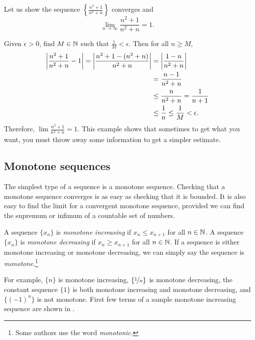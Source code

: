 \begin{example}
Let us show the sequence $\left\{ \frac{n^2+1}{n^2+n} \right\}$ converges and
\begin{equation*}
\lim_{n\to\infty} \frac{n^2+1}{n^2+n} = 1 .
\end{equation*}

Given $\epsilon > 0$,
find $M \in {\mathbb{N}}$ such that $\frac{1}{M} < \epsilon$.  Then for all $n \geq
M$,
\begin{equation*}
\begin{split}
\left\lvert {\frac{n^2+1}{n^2+n} - 1} \right\rvert  =
\left\lvert {\frac{n^2+1 - (n^2+n)}{n^2+n}} \right\rvert
& =
\left\lvert {\frac{1 - n}{n^2+n}} \right\rvert \\
& =
\frac{n-1}{n^2+n} \\
& \leq 
\frac{n}{n^2+n} 
 =
\frac{1}{n+1}  \\
& \leq \frac{1}{n}
\leq \frac{1}{M} < \epsilon .
\end{split}
\end{equation*}
Therefore,
$\lim \frac{n^2+1}{n^2+n} = 1$.
This example shows that sometimes to get what you want, you must throw away
some information to get a simpler estimate.
\end{example}

\subsection{Monotone sequences}

The simplest type of a sequence is a monotone sequence.  Checking that
a monotone sequence converges is as easy as checking that it is bounded.
It is also easy to find
the limit for a convergent
monotone sequence, provided we can find the supremum or infimum
of a countable set of numbers.

\begin{defn}
A sequence $\{ x_n \}$ is \emph{monotone increasing} if $x_n \leq x_{n+1}$ for all $n \in {\mathbb{N}}$.  
%
A sequence $\{ x_n \}$ is \emph{monotone decreasing} if $x_n \geq x_{n+1}$ for all $n \in {\mathbb{N}}$.  
%
If a sequence is either monotone increasing or monotone decreasing, we
can simply say the sequence is \emph{monotone}.\footnote{Some
authors use the word \emph{monotonic}.}
\end{defn}

For example,
$\{ n \}$ is monotone increasing,
$\{ \nicefrac{1}{n} \}$ is monotone decreasing,
the constant sequence $\{ 1 \}$ is both monotone increasing and monotone
decreasing, and $\{ {(-1)}^n \}$ is not monotone.
First few terms of a sample monotone increasing sequence
are shown in 
.

